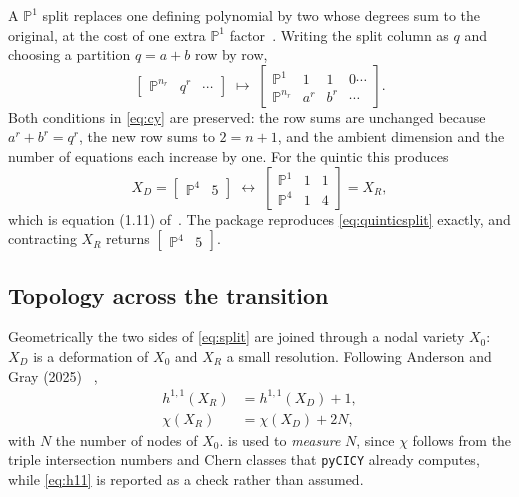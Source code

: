 \documentclass[11pt,a4paper]{article}
\newcommand{\PP}{\mathbb{P}}
\newcommand{\XD}{X_D}
\newcommand{\XR}{X_R}
\theoremstyle{definition}
\begin{document}
A $\PP^1$ split replaces one defining polynomial by two whose degrees sum to
the original, at the cost of one extra $\PP^1$ factor~\cite{Candelas1988}.
Writing the split column as $q$ and choosing a partition
$q = a + b$ row by row,
%
\begin{equation}
\begin{bmatrix} \PP^{n_r} & q^r & \cdots \end{bmatrix}
\;\longmapsto\;
\begin{bmatrix}
\PP^{1}   & 1   & 1   & 0\cdots\\
\PP^{n_r} & a^r & b^r & \cdots
\end{bmatrix} .
\label{eq:split}
\end{equation}
%
Both conditions in \cref{eq:cy} are preserved: the row sums are unchanged
because $a^r + b^r = q^r$, the new row sums to $2 = n+1$, and the ambient
dimension and the number of equations each increase by one. For the quintic
this produces
%
\begin{equation}
\XD=\begin{bmatrix}\PP^4 & 5\end{bmatrix}
\;\longleftrightarrow\;
\begin{bmatrix}\PP^1 & 1 & 1\\ \PP^4 & 1 & 4\end{bmatrix}=\XR ,
\label{eq:quinticsplit}
\end{equation}
%
which is equation (1.11) of~\cite{Anderson2025}. The package reproduces
\cref{eq:quinticsplit} exactly, and contracting $\XR$ returns
$\begin{bmatrix}\PP^4 & 5\end{bmatrix}$.

\subsection{Topology across the transition}

Geometrically the two sides of \cref{eq:split} are joined through a nodal
variety $X_0$: $\XD$ is a deformation of $X_0$ and $\XR$ a small resolution.
Following Anderson and Gray (2025) ~\cite{Anderson2025},
%
\begin{align}
h^{1,1}(\XR) &= h^{1,1}(\XD) + 1, \label{eq:h11}\\
\chi(\XR)    &= \chi(\XD) + 2N,   \label{eq:chi}
\end{align}
%
with $N$ the number of nodes of $X_0$.  is used to
\emph{measure} $N$, since $\chi$ follows from the triple intersection numbers
and Chern classes that \texttt{pyCICY} already computes, while \cref{eq:h11}
is reported as a check rather than assumed.
\end{document}
